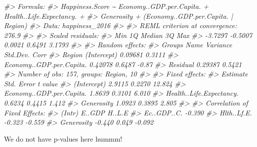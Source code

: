 \documentclass[
]{book}
\newenvironment{Shaded}{\begin{snugshade}}{\end{snugshade}}
\newcommand{\CommentTok}[1]{\textcolor[rgb]{0.56,0.35,0.01}{\textit{#1}}}
\theoremstyle{definition}
\theoremstyle{definition}
\theoremstyle{definition}
\theoremstyle{definition}
\theoremstyle{remark}
\begin{document}
\begin{Shaded}
\begin{Highlighting}[]
\CommentTok{\#\textgreater{} Formula: }
\CommentTok{\#\textgreater{} Happiness.Score \textasciitilde{} Economy..GDP.per.Capita. + Health..Life.Expectancy. +  }
\CommentTok{\#\textgreater{}     Generosity + (Economy..GDP.per.Capita. | Region)}
\CommentTok{\#\textgreater{}    Data: happiness\_2016}
\CommentTok{\#\textgreater{} }
\CommentTok{\#\textgreater{} REML criterion at convergence: 276.9}
\CommentTok{\#\textgreater{} }
\CommentTok{\#\textgreater{} Scaled residuals: }
\CommentTok{\#\textgreater{}     Min      1Q  Median      3Q     Max }
\CommentTok{\#\textgreater{} {-}3.7297 {-}0.5007  0.0021  0.6491  3.1793 }
\CommentTok{\#\textgreater{} }
\CommentTok{\#\textgreater{} Random effects:}
\CommentTok{\#\textgreater{}  Groups   Name                     Variance Std.Dev. Corr }
\CommentTok{\#\textgreater{}  Region   (Intercept)              0.09681  0.3111        }
\CommentTok{\#\textgreater{}           Economy..GDP.per.Capita. 0.42078  0.6487   {-}0.87}
\CommentTok{\#\textgreater{}  Residual                          0.29387  0.5421        }
\CommentTok{\#\textgreater{} Number of obs: 157, groups:  Region, 10}
\CommentTok{\#\textgreater{} }
\CommentTok{\#\textgreater{} Fixed effects:}
\CommentTok{\#\textgreater{}                          Estimate Std. Error t value}
\CommentTok{\#\textgreater{} (Intercept)                2.9115     0.2270  12.824}
\CommentTok{\#\textgreater{} Economy..GDP.per.Capita.   1.8639     0.3101   6.010}
\CommentTok{\#\textgreater{} Health..Life.Expectancy.   0.6234     0.4415   1.412}
\CommentTok{\#\textgreater{} Generosity                 1.0923     0.3895   2.805}
\CommentTok{\#\textgreater{} }
\CommentTok{\#\textgreater{} Correlation of Fixed Effects:}
\CommentTok{\#\textgreater{}             (Intr) E..GDP H..L.E}
\CommentTok{\#\textgreater{} Ec..GDP..C. {-}0.390              }
\CommentTok{\#\textgreater{} Hlth..Lf.E. {-}0.323 {-}0.559       }
\CommentTok{\#\textgreater{} Generosity  {-}0.440  0.049 {-}0.092}
\end{Highlighting}
\end{Shaded}

We do not have p-values here hummm!
\end{document}

